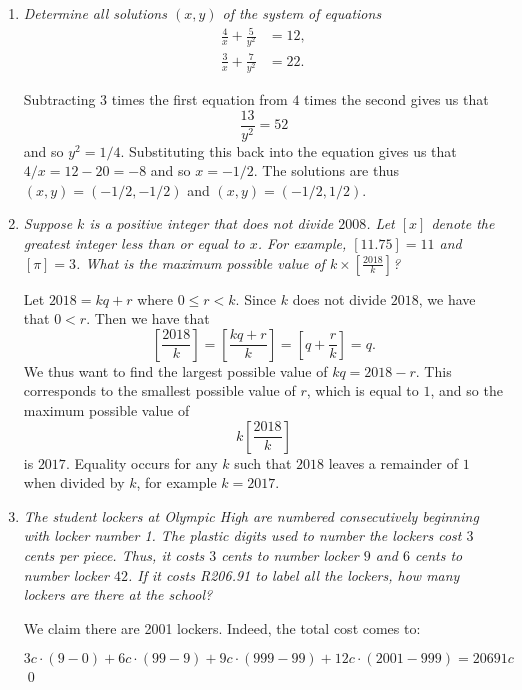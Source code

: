 \documentclass{article}
\begin{document}
\begin{enumerate}[1.]
\vspace{6pt}
\item 
\textit{Determine all solutions $(x,y)$ of the system of equations
\begin{align*}
  \frac{4}{x} +\frac{5}{y^2} &= 12, \\
  \frac{3}{x} +\frac{7}{y^2} &= 22.
\end{align*}}

Subtracting $3$ times the first equation from $4$ times the second gives us that
\[
	\frac{13}{y^2} = 52
\]
and so $y^2 = 1/4$. Substituting this back into the equation gives us that $4/x = 12 - 20 = -8$ and so $x = -1/2$. The solutions are thus $(x, y) = (-1/2, -1/2)$ and $(x, y) = (-1/2, 1/2)$.

\item 
\textit{Suppose $k$ is a positive integer that does not divide $2008$. Let $[x]$ denote the greatest integer less than or equal to $x$. For example, $[11.75] = 11$ and $[\pi] = 3$. What is the maximum possible value of $k \times \left[\frac{2018}{k}\right]$?}

Let $2018 = kq + r$ where $0 \leq r < k$. Since $k$ does not divide $2018$, we have that $0 < r$. Then we have that
\[
	\left[ \frac{2018}{k} \right] = \left[ \frac{kq + r}{k} \right] = \left[ q + \frac{r}{k} \right] = q.
\]
We thus want to find the largest possible value of $kq = 2018 - r$. This corresponds to the smallest possible value of $r$, which is equal to $1$, and so the maximum possible value of
\[
	k \left[ \frac{2018}{k} \right]
\]
is $2017$. Equality occurs for any $k$ such that $2018$ leaves a remainder of $1$ when divided by $k$, for example $k = 2017$.


\vspace{6pt}
\item %
\textit{The student lockers at Olympic High are numbered consecutively beginning with locker number 1. The plastic digits used to number the lockers cost $3$ cents per piece. Thus, it costs $3$ cents to number locker $9$ and $6$ cents to number locker $42$. If it costs R206.91 to label all the lockers, how many lockers are there at the school?}

We claim there are 2001 lockers. Indeed, the total cost comes to:

\begin{equation*}
    3c \cdot (9 - 0) + 6c \cdot (99 - 9) + 9c \cdot (999 - 99) + 12c \cdot (2001 - 999) = 20691c
\end{equation*}
\qed
\vspace{5mm}


\end{enumerate}
\end{document}
